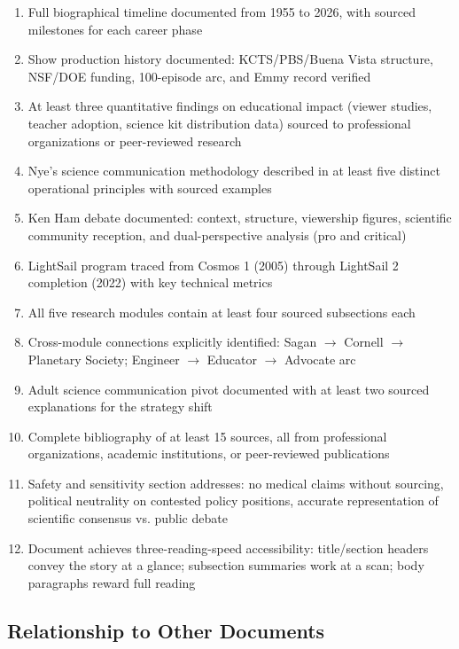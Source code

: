 \documentclass[11pt,letterpaper]{article}
\begin{document}
\begin{enumerate}[leftmargin=*, label=\textbf{SC-\arabic*.}]
  \item Full biographical timeline documented from 1955 to 2026, with sourced milestones for each career phase
  \item Show production history documented: KCTS/PBS/Buena Vista structure, NSF/DOE funding, 100-episode arc, and Emmy record verified
  \item At least three quantitative findings on educational impact (viewer studies, teacher adoption, science kit distribution data) sourced to professional organizations or peer-reviewed research
  \item Nye's science communication methodology described in at least five distinct operational principles with sourced examples
  \item Ken Ham debate documented: context, structure, viewership figures, scientific community reception, and dual-perspective analysis (pro and critical)
  \item LightSail program traced from Cosmos 1 (2005) through LightSail 2 completion (2022) with key technical metrics
  \item All five research modules contain at least four sourced subsections each
  \item Cross-module connections explicitly identified: Sagan $\rightarrow$ Cornell $\rightarrow$ Planetary Society; Engineer $\rightarrow$ Educator $\rightarrow$ Advocate arc
  \item Adult science communication pivot documented with at least two sourced explanations for the strategy shift
  \item Complete bibliography of at least 15 sources, all from professional organizations, academic institutions, or peer-reviewed publications
  \item Safety and sensitivity section addresses: no medical claims without sourcing, political neutrality on contested policy positions, accurate representation of scientific consensus vs. public debate
  \item Document achieves three-reading-speed accessibility: title/section headers convey the story at a glance; subsection summaries work at a scan; body paragraphs reward full reading
\end{enumerate}

\subsection{Relationship to Other Documents}
\end{document}
